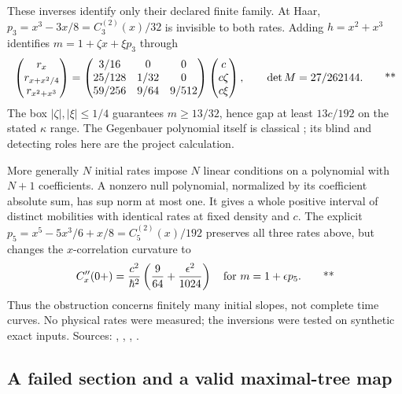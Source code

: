 These inverses identify only their declared finite family. At Haar,
\(p_3=x^3-3x/8=C_3^{(2)}(x)/32\) is invisible to both rates.
Adding \(h=x^2+x^3\) identifies \(m=1+\zeta x+\xi p_3\) through
\begin{equation}
 \begin{pmatrix}r_x\\r_{x+x^2/4}\\r_{x^2+x^3}\end{pmatrix}
 =
 \begin{pmatrix}
 3/16&0&0\\25/128&1/32&0\\59/256&9/64&9/512
 \end{pmatrix}
 \begin{pmatrix}c\\c\zeta\\c\xi\end{pmatrix},
 \qquad \det M=27/262144.
 \qquad\text{**}
 \label{eq:middle-rates}
\end{equation}
The box \(|\zeta|,|\xi|\le1/4\) guarantees \(m\ge13/32\), hence
gap at least \(13c/192\) on the stated \(\kappa\) range.
The Gegenbauer polynomial itself is classical
\cite{nistDLMFGegenbauer}; its blind and detecting roles here are the
project calculation.

More generally \(N\) initial rates impose \(N\) linear conditions on
a polynomial with \(N+1\) coefficients. A nonzero null polynomial,
normalized by its coefficient absolute sum, has sup norm at most one.
It gives a whole positive interval of distinct mobilities with identical
rates at fixed density and \(c\). The explicit
\(p_5=x^5-5x^3/6+x/8=C_5^{(2)}(x)/192\) preserves all three rates above,
but changes the \(x\)-correlation curvature to
\[
 C_x''(0+)=\frac{c^2}{\hbar^2}
          \left(\frac9{64}+\frac{\epsilon^2}{1024}\right)
 \quad\text{for }m=1+\epsilon p_5.
 \qquad\text{**}
\]
Thus the obstruction concerns finitely many initial slopes, not complete
time curves. No physical rates were measured; the inversions were tested
on synthetic exact inputs. Sources:
,
,
,
.

\subsection{A failed section and a valid maximal-tree map \workstar}
\label{sec:middle-tree}

